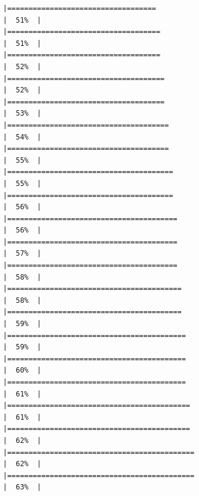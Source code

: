 \documentclass[
]{article}
\begin{document}
\begin{verbatim}
|===================================                                   |  51%  |                                                                              |====================================                                  |  51%  |                                                                              |====================================                                  |  52%  |                                                                              |=====================================                                 |  52%  |                                                                              |=====================================                                 |  53%  |                                                                              |======================================                                |  54%  |                                                                              |======================================                                |  55%  |                                                                              |=======================================                               |  55%  |                                                                              |=======================================                               |  56%  |                                                                              |========================================                              |  56%  |                                                                              |========================================                              |  57%  |                                                                              |========================================                              |  58%  |                                                                              |=========================================                             |  58%  |                                                                              |=========================================                             |  59%  |                                                                              |==========================================                            |  59%  |                                                                              |==========================================                            |  60%  |                                                                              |==========================================                            |  61%  |                                                                              |===========================================                           |  61%  |                                                                              |===========================================                           |  62%  |                                                                              |============================================                          |  62%  |                                                                              |============================================                          |  63%  |                                                                              
\end{verbatim}
\end{document}
